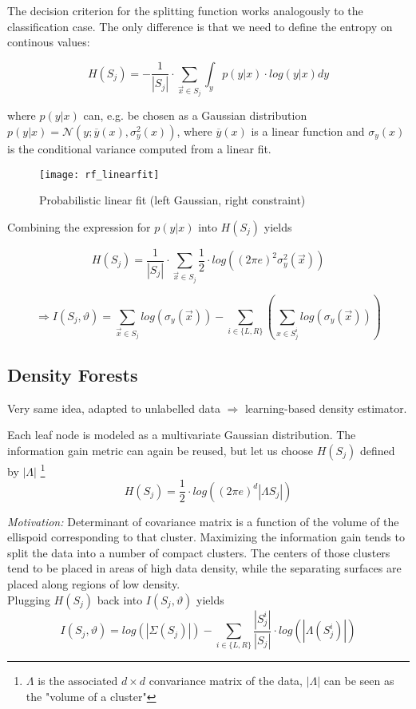 The decision criterion for the splitting function works analogously to the classification case. The only difference is that we need to define the entropy on continous values:

\[H(S_j) = -\frac{1}{|S_j|} \cdot \sum_{\vec{x} \in S_j} \int_y p(y|x) \cdot log(y|x)dy\]

where \(p(y|x)\) can, e.g. be chosen as a Gaussian distribution \(p(y|x) = \mathcal{N}(y; \overline{y}(x), \sigma_y^2(x))\), where \(\overline{y}(x)\) is a linear function and \(\sigma_y(x)\) is the conditional variance computed from a linear fit.

\begin{figure}[H]
	\centering
    \texttt{[image: rf\_linearfit]}
    \caption{Probabilistic linear fit (left Gaussian, right constraint)}
\end{figure}

Combining the expression for \(p(y|x)\) into \(H(S_j)\) yields

\[H(S_j) = \frac{1}{|S_j|} \cdot \sum_{\vec{x} \in S_j} \frac{1}{2} \cdot log((2 \pi e)^2 \sigma_y^2(\vec{x}))\]

\[\Rightarrow I(S_j, \vartheta) = \sum_{\vec{x} \in S_j} log(\sigma_y(\vec{x})) - \sum_{i \in \{L, R\}} (\sum_{x \in S_j^i} log (\sigma_y(\vec{x}))) \]

\newpage
\subsection*{Density Forests}
Very same idea, adapted to unlabelled data $\Rightarrow$ learning-based density estimator.

Each leaf node is modeled as a multivariate Gaussian distribution. The information gain metric can again be reused, but let us choose \(H(S_j)\) defined by $|\Lambda|$ \footnote{$\Lambda$ is the associated $d \times d$ convariance matrix of the data, $|\Lambda|$  can be seen as the "volume of a cluster"}
\[
  H(S_j) = \frac{1}{2} \cdot log((2 \pi e)^d |\Lambda S_j|)
\]

\textit{Motivation:}
Determinant of covariance matrix is a function of the volume of the ellispoid corresponding to that cluster. Maximizing the information gain tends to split the data into a number of compact clusters. The centers of those clusters tend to be placed in areas of high data density, while the separating surfaces are placed along regions of low density.\\

Plugging \(H(S_j)\) back into \(I(S_j, \vartheta)\) yields
\[I(S_j, \vartheta) = log (|\Sigma(S_j)|) - \sum_{i \in \{L, R\}} \frac{|S_j^i|}{|S_j|} \cdot log(|\Lambda(S_j^i)|)\]

